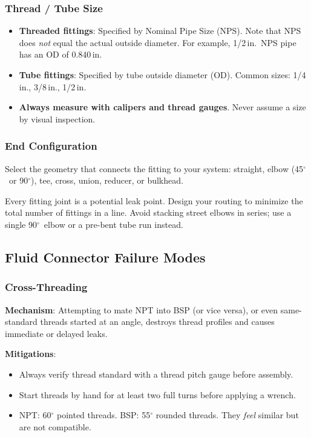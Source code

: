 \documentclass[11pt,letterpaper,twoside,openany]{book}
\providecommand{\ang}[1]{#1\ensuremath{{}^{\circ}}}
\begin{document}
\subsubsection{Thread / Tube Size}

\begin{itemize}[nosep,leftmargin=1.5em]
  \item \textbf{Threaded fittings}: Specified by Nominal Pipe Size (NPS). Note that NPS does \emph{not} equal the actual outside diameter. For example, 1/2\,in.\ NPS pipe has an OD of 0.840\,in.
  \item \textbf{Tube fittings}: Specified by tube outside diameter (OD). Common sizes: 1/4\,in., 3/8\,in., 1/2\,in.
  \item \textbf{Always measure with calipers and thread gauges}. Never assume a size by visual inspection.
\end{itemize}

\subsubsection{End Configuration}

Select the geometry that connects the fitting to your system: straight, elbow (45$^{\circ}$\ or 90$^{\circ}$), tee, cross, union, reducer, or bulkhead. 

\begin{tipbox}
Every fitting joint is a potential leak point. Design your routing to minimize the total number of fittings in a line. Avoid stacking street elbows in series; use a single 90$^{\circ}$\ elbow or a pre-bent tube run instead.
\end{tipbox}


\subsection{Fluid Connector Failure Modes}
\label{sec:fluidfailure}

\subsubsection{Cross-Threading}

\textbf{Mechanism}: Attempting to mate NPT into BSP (or vice versa), or even same-standard threads started at an angle, destroys thread profiles and causes immediate or delayed leaks.

\textbf{Mitigations}:
\begin{itemize}[nosep,leftmargin=1.5em]
  \item Always verify thread standard with a thread pitch gauge before assembly.
  \item Start threads by hand for at least two full turns before applying a wrench.
  \item NPT: \ang{60} pointed threads. BSP: \ang{55} rounded threads. They \emph{feel} similar but are not compatible.
\end{itemize}
\end{document}
